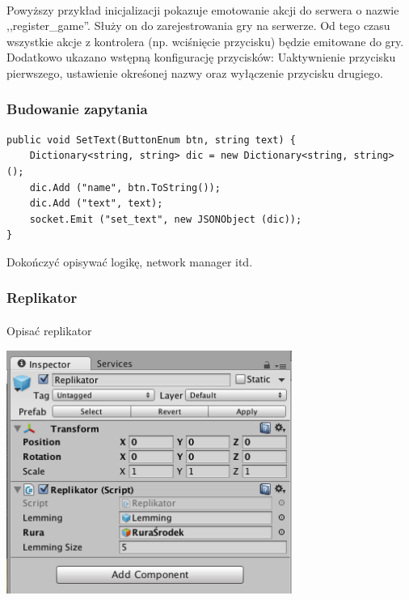 \paragraph{}
Powyższy przykład inicjalizacji pokazuje emotowanie akcji do serwera o nazwie ,,register\_game''. Służy on do zarejestrowania gry na serwerze. Od tego czasu wszystkie akcje z kontrolera (np. wciśnięcie przycisku) będzie emitowane do gry.
Dodatkowo ukazano wstępną konfigurację przycisków: Uaktywnienie przycisku pierwszego, ustawienie okreśonej nazwy oraz wyłączenie przycisku drugiego.

\subsubsection{Budowanie zapytania}

\begin{lstlisting}[language=CSharp]
public void SetText(ButtonEnum btn, string text) {
	Dictionary<string, string> dic = new Dictionary<string, string> ();
	dic.Add ("name", btn.ToString());
	dic.Add ("text", text);
	socket.Emit ("set_text", new JSONObject (dic));
}
\end{lstlisting}




{\color{red}Dokończyć opisywać logikę, network manager itd}.

\subsubsection{Replikator}
\paragraph{}
{\color{red}Opisać replikator}
\begin{center}
\includegraphics[width=0.7\textwidth]{images/replikator.png}
\end{center}

